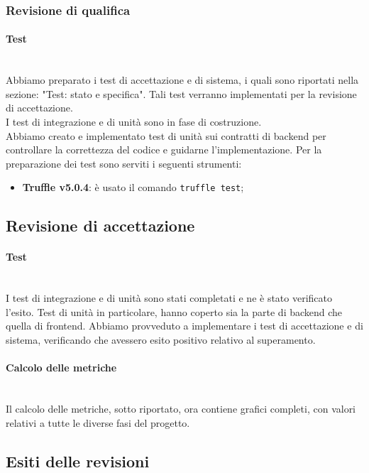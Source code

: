 \subsubsection{Revisione di qualifica}
\paragraph{Test}\mbox{}\\
Abbiamo preparato i test di accettazione e di sistema, i quali sono riportati nella sezione: "Test: stato e specifica". Tali test verranno implementati per la revisione di accettazione.\\
I test di integrazione e di unità sono in fase di costruzione.\\
Abbiamo creato e implementato test di unità sui contratti di backend per controllare la correttezza del codice e guidarne l'implementazione. 
Per la preparazione dei test sono serviti i seguenti strumenti:
\begin{itemize}
	\item \textbf{Truffle v5.0.4}: è usato il comando \texttt{truffle test};
\end{itemize}
\subsection{Revisione di accettazione}
\paragraph{Test}\mbox{}\\
I test di integrazione e di unità sono stati completati e ne è stato verificato l'esito.
Test di unità in particolare, hanno coperto sia la parte di backend che quella di frontend.
Abbiamo provveduto a implementare i test di accettazione e di sistema, verificando che avessero esito positivo relativo al superamento.\\
\paragraph{Calcolo delle metriche} \mbox{}\\
Il calcolo delle metriche, sotto riportato, ora contiene grafici completi, con valori relativi a tutte le diverse fasi del progetto.

\subsection{Esiti delle revisioni}
